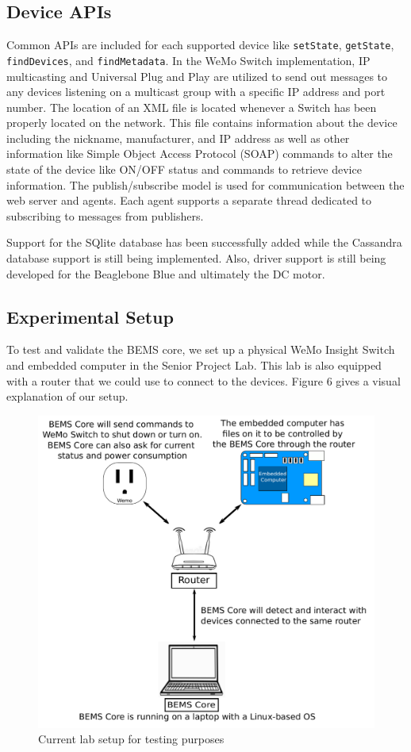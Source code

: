 \documentclass[letterpaper,12pt]{article}   %
\begin{document}
\subsection{Device APIs}
Common APIs are included for each supported device like \texttt{setState}, \texttt{getState}, \texttt{findDevices}, and \texttt{findMetadata}. In the WeMo Switch implementation, IP multicasting and Universal Plug and Play are utilized to send out messages to any devices listening on a multicast group with a specific IP address and port number. The location of an XML file is located whenever a Switch has been properly located on the network. This file contains information about the device including the nickname, manufacturer, and IP address as well as other information like Simple Object Access Protocol (SOAP) commands to alter the state of the device like ON/OFF status and commands to retrieve device information. The publish/subscribe model is used for communication between the web server and agents. Each agent supports a separate thread dedicated to subscribing to messages from publishers.

Support for the SQlite database has been successfully added while the Cassandra database support is still being implemented. Also, driver support is still being developed for the Beaglebone Blue and ultimately the DC motor.

\subsection{Experimental Setup} \label{sec:expsetup}
To test and validate the BEMS core, we set up a physical WeMo Insight Switch and embedded computer in the Senior Project Lab. This lab is also equipped with a router that we could use to connect to the devices. Figure 6 gives a visual explanation of our setup.

\begin{figure}[H]
    \centering
    \includegraphics[scale=0.55]{figs/experimentalSetup.pdf}
    \caption{Current lab setup for testing purposes}
    \label{fig:expLabSetup}
\end{figure}
\end{document}

